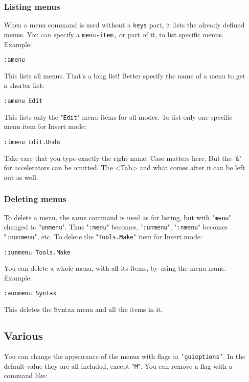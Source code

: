 \subsubsection{Listing menus}
When a menu command is used without a \texttt{{keys}} part, it lists the already defined menus.
You can specify a \texttt{{menu-item},} or part of it, to list specific menus.
Example:

\begin{Verbatim}[samepage=true]
 :amenu
\end{Verbatim}

This lists all menus.
That's a long list!  Better specify the name of a menu to get a shorter list:

\begin{Verbatim}[samepage=true]
 :amenu Edit
\end{Verbatim}

This lists only the "\texttt{Edit}" menu items for all modes.
To list only one specific menu item for Insert mode:

\begin{Verbatim}[samepage=true]
 :imenu Edit.Undo
\end{Verbatim}

Take care that you type exactly the right name.
Case matters here.
But the '\texttt{\&}' for accelerators can be omitted.
The <Tab> and what comes after it can be left out as well.

\subsubsection{Deleting menus}
To delete a menu, the same command is used as for listing, but with "\texttt{menu}" changed to "\texttt{unmenu}".
Thus "\texttt{:menu}" becomes, "\texttt{:unmenu}", "\texttt{:nmenu}" becomes "\texttt{:nunmenu}", etc.
To delete the "\texttt{Tools.Make}" item for Insert mode:

\begin{Verbatim}[samepage=true]
 :iunmenu Tools.Make
\end{Verbatim}

You can delete a whole menu, with all its items, by using the menu name.
Example:

\begin{Verbatim}[samepage=true]
 :aunmenu Syntax
\end{Verbatim}

This deletes the Syntax menu and all the items in it.
\subsection{Various}
You can change the appearance of the menus with flags in \texttt{'guioptions'}.
In the default value they are all included, except "\texttt{M}".
You can remove a flag with a command like:

